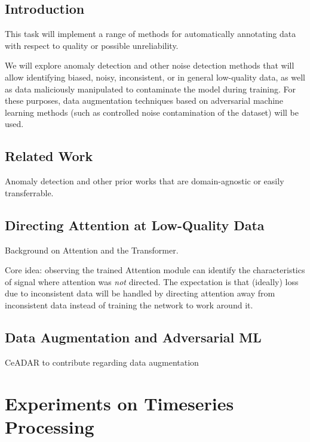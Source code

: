 
\subsection{Introduction}

This task will implement a range of methods for automatically
annotating data with respect to quality or possible unreliability.

We will explore anomaly detection and other noise detection methods
that will allow identifying biased, noisy, inconsistent, or in general
low-quality data, as well as data maliciously manipulated to
contaminate the model during training. For these purposes, data
augmentation techniques based on adversarial machine learning methods
(such as controlled noise contamination of the dataset) will be used.

\subsection{Related Work}

Anomaly detection and other prior works that are domain-agnostic or
easily transferrable.


\subsection{Directing Attention at Low-Quality Data}

Background on Attention and the Transformer.

Core idea: observing the trained Attention module can identify the
characteristics of signal where attention was \emph{not} directed.
The expectation is that (ideally) loss due to inconsistent data will
be handled by directing attention away from inconsistent data instead
of training the network to work around it.


\subsection{Data Augmentation and Adversarial ML}

%
{CeADAR to contribute regarding data augmentation}


\section{Experiments on Timeseries Processing}


